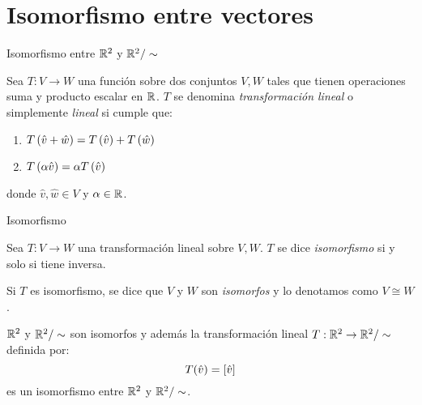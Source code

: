     \section{Isomorfismo entre vectores}
    \begin{frame}{Isomorfismo entre $\rmath[2]$ y $\rmath[2]/\sim$}
        \begin{mdefinition}
            Sea $T: V\to W$ una función sobre dos conjuntos $V, W$ tales que tienen operaciones suma y producto escalar en $\rmath$. $T$ se denomina \emph{transformación lineal} o simplemente \emph{lineal} si cumple que:
            \begin{enumerate}
                \item $T\pa{\hat{v} +\hat{w}} = T\pa{\hat{v}} + T\pa{\hat{w}}$
                \item $T\pa{\alpha\hat{v}} = \alpha T\pa{\hat{v}}$
            \end{enumerate}
            donde $\hat{v},\hat{w}\in V$ y $\alpha\in\rmath$.
        \end{mdefinition}
    \end{frame}
    \begin{frame}{Isomorfismo}
        \begin{mdefinition}[Isomorfismo]
            Sea $T: V\to W$ una transformación lineal sobre $V, W$. $T$ se dice \emph{isomorfismo} si y solo si tiene inversa.\par 
            Si $T$ es isomorfismo, se dice que $V$ y $W$ son \emph{isomorfos} y lo denotamos como $V\cong W$.
        \end{mdefinition}
    \end{frame}
    \begin{frame}{}
        \begin{mtheorem}
            $\rmath[2]$ y $\rmath[2]/\sim$ son isomorfos y además la transformación lineal $T:\rmath[2]\to\rmath[2]/\sim$ definida por:
            \[T(\hat{v}) =\bracket{\hat{v}}\]
            es un isomorfismo entre $\rmath[2]$ y $\rmath[2]/\sim$.
        \end{mtheorem}
    \end{frame}

